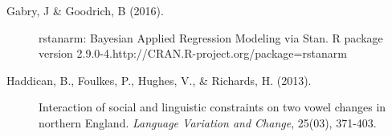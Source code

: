 \documentclass[a0,portrait]{a0poster}
\begin{document}
\begin{multicols*}{3}
\begin{description}
\item[Gabry, J \& Goodrich, B (2016).]{rstanarm: Bayesian Applied Regression Modeling via Stan. R package version 2.9.0-4.http://CRAN.R-project.org/package=rstanarm}


\item[Haddican, B., Foulkes, P., Hughes, V., \& Richards, H. (2013).]{Interaction of social and linguistic constraints on two vowel changes in northern England. \textit{Language Variation and Change}, 25(03), 371-403.}


\end{description}
%
%

\end{multicols*}
\end{document}
